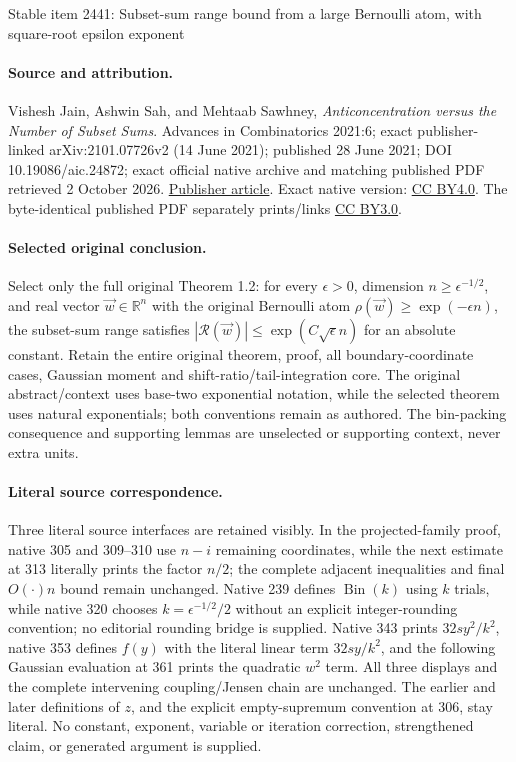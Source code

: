 \documentclass[11pt]{article}
\numberwithin{equation}{section}
\theoremstyle{definition}
\theoremstyle{remark}
\begin{document}
\begin{center}{\Large Stable item 2441: Subset-sum range bound from a large Bernoulli atom, with square-root epsilon exponent}\end{center}
\paragraph{Source and attribution.} Vishesh Jain, Ashwin Sah, and Mehtaab Sawhney, \emph{Anticoncentration versus the Number of Subset Sums}. Advances in Combinatorics 2021:6; exact publisher-linked arXiv:2101.07726v2 (14 June 2021); published 28 June 2021; DOI 10.19086/aic.24872; exact official native archive and matching published PDF retrieved 2 October 2026. \href{https://www.advancesincombinatorics.com/article/24872-anticoncentration-versus-the-number-of-subset-sums}{Publisher article}. Exact native version: \href{https://creativecommons.org/licenses/by/4.0/}{CC BY4.0}. The byte-identical published PDF separately prints/links \href{https://creativecommons.org/licenses/by/3.0/}{CC BY3.0}.
\paragraph{Selected original conclusion.} Select only the full original Theorem 1.2: for every \(\epsilon>0\), dimension \(n\ge\epsilon^{-1/2}\), and real vector \(\vec w\in\mathbb R^n\) with the original Bernoulli atom \(\rho(\vec w)\ge\exp(-\epsilon n)\), the subset-sum range satisfies \(|\mathcal R(\vec w)|\le\exp(C\sqrt\epsilon n)\) for an absolute constant. Retain the entire original theorem, proof, all boundary-coordinate cases, Gaussian moment and shift-ratio/tail-integration core. The original abstract/context uses base-two exponential notation, while the selected theorem uses natural exponentials; both conventions remain as authored. The bin-packing consequence and supporting lemmas are unselected or supporting context, never extra units.
\paragraph{Literal source correspondence.} Three literal source interfaces are retained visibly. In the projected-family proof, native 305 and 309--310 use \(n-i\) remaining coordinates, while the next estimate at 313 literally prints the factor \(n/2\); the complete adjacent inequalities and final \(O(\cdot)n\) bound remain unchanged. Native 239 defines \(\operatorname{Bin}(k)\) using \(k\) trials, while native 320 chooses \(k=\epsilon^{-1/2}/2\) without an explicit integer-rounding convention; no editorial rounding bridge is supplied. Native 343 prints \(32sy^2/k^2\), native 353 defines \(f(y)\) with the literal linear term \(32sy/k^2\), and the following Gaussian evaluation at 361 prints the quadratic \(w^2\) term. All three displays and the complete intervening coupling/Jensen chain are unchanged. The earlier and later definitions of \(z\), and the explicit empty-supremum convention at 306, stay literal. No constant, exponent, variable or iteration correction, strengthened claim, or generated argument is supplied.
\end{document}
